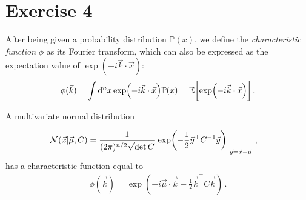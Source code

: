 \documentclass[main.tex]{subfiles}
\begin{document}
\section*{Exercise 4}


After being given a probability distribution \(\mathbb{P}(x)\), we define the \emph{characteristic function} \(\phi \) as its Fourier transform, which can also be expressed as the expectation value of \(\exp(- i \vec{k} \cdot \vec{x})\): 
%
\begin{align}
\phi (\vec{k}) = \int \dd[n]{x} \exp(- i \vec{k} \cdot \vec{x}) \mathbb{P}(x) 
= \mathbb{E} \qty[ \exp(- i \vec{k} \cdot \vec{x})]
\,.
\end{align}

\begin{claim}
A multivariate normal distribution 
%
\begin{align}
\mathcal{N}(\vec{x} | \vec{\mu}, C)
&= \frac{1}{(2\pi )^{n/2} \sqrt{\det C}} \eval{\exp(- \frac{1}{2} \vec{y}^{\top} C^{-1} \vec{y})}_{\vec{y} = \vec{x} - \vec{\mu}}
\,,
\end{align}
%
has a characteristic function equal to 
%
\begin{align}
\phi (\vec{k}) = \exp(- i \vec{\mu}\cdot \vec{k} - \frac{1}{2} \vec{k}^{\top} C \vec{k}) 
\,.
\end{align}
\end{claim}
\end{document}
